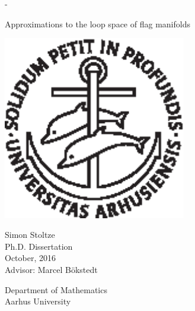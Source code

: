 \begin{titlingpage}
  \calccentering{\unitlength}
  \begin{adjustwidth*}{\unitlength}{-\unitlength}
    \begin{adjustwidth}{-1cm}{-1cm} 
      \vspace*{2cm}
      \centering
      \scshape
      
      {\Huge Approximations to the loop space of \newline\newline flag
        manifolds} \\
      
      \vspace*{3\onelineskip}
      
      \includegraphics[width=8cm]{billeder/segla1s.ps}    
      
      \vspace*{3\onelineskip}
      {\Large
        \linespread{1.4}\selectfont
        {\huge Simon Stoltze}\\
        Ph.D. Dissertation\\
        October, 2016 %
        \\ 
        \vspace{1em}
        Advisor: Marcel B\"okstedt}
      
      \strut\vfill
      Department of Mathematics\\
      Aarhus University
    \end{adjustwidth}
  \end{adjustwidth*}
  
\end{titlingpage}


